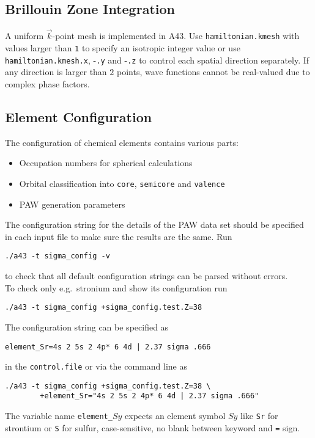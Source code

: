 \documentclass[oribibl]{llncs}
\newcommand{\ttt}[1]{\texttt{#1}}
\newcommand{\codename}{A43}
\begin{document}
\subsection{Brillouin Zone Integration} \label{sec:brillouin-zone}
%
A uniform $\vec k$-point mesh is implemented in \codename{}.
Use \ttt{hamiltonian.kmesh} with values larger than \ttt{1} to
specify an isotropic integer value or use
\ttt{hamiltonian.kmesh.x}, -\ttt{.y} and -\ttt{.z} 
to control each spatial direction separately.
If any direction is larger than $2$ points,
wave functions cannot be real-valued due to complex phase factors.
%
%

\subsection{Element Configuration} \label{sec:sigma-config}
%
The configuration of chemical elements contains various parts:
\begin{itemize}
  \item Occupation numbers for spherical calculations
  \item Orbital classification into \ttt{core}, \ttt{semicore} and \ttt{valence}
  \item \ac{PAW} generation parameters
\end{itemize}
%
\noindent
The configuration string for the details of the \ac{PAW} data set should be 
specified in each input file to make sure the results are the same. Run
\begin{verbatim}
./a43 -t sigma_config -v
\end{verbatim}
to check that all default configuration strings can be parsed without errors.
\\
To check only e.g.~stronium and show its configuration run
\begin{verbatim}
./a43 -t sigma_config +sigma_config.test.Z=38
\end{verbatim}
The configuration string can be specified as
\begin{verbatim}
element_Sr=4s 2 5s 2 4p* 6 4d | 2.37 sigma .666
\end{verbatim}
in the \ttt{control.file} or via the command line as
\begin{verbatim}
./a43 -t sigma_config +sigma_config.test.Z=38 \
        +element_Sr="4s 2 5s 2 4p* 6 4d | 2.37 sigma .666"
\end{verbatim}
The variable name \ttt{element\_}$Sy$ expects an element symbol $Sy$ 
like \ttt{Sr} for strontium or \ttt{S} for sulfur, case-sensitive, no blank between keyword and \ttt{=} sign.
\end{document}
